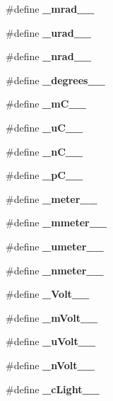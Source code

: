 \begin{CompactItemize}
\item 
\#define \textbf{\_\-mrad\_\-\_\-}\label{bpm__units_8h_4d6c281cb96e2265c761e2548528b266}

\item 
\#define \textbf{\_\-urad\_\-\_\-}\label{bpm__units_8h_6093ed7c7a103bf9e2fd3972e928fb13}

\item 
\#define \textbf{\_\-nrad\_\-\_\-}\label{bpm__units_8h_798792094a66ffcadcfc530d8acbee46}

\item 
\#define \textbf{\_\-degrees\_\-\_\-}\label{bpm__units_8h_631ddf20ea27e7e69d032bf17d4cade9}

\item 
\#define \textbf{\_\-mC\_\-\_\-}\label{bpm__units_8h_b08b83792d971febbd6badaac28c51d4}

\item 
\#define \textbf{\_\-uC\_\-\_\-}\label{bpm__units_8h_9108dd8cbb5e6db5f664d790016cda8b}

\item 
\#define \textbf{\_\-nC\_\-\_\-}\label{bpm__units_8h_12f5841aa9c4bac2152d6052829ea628}

\item 
\#define \textbf{\_\-pC\_\-\_\-}\label{bpm__units_8h_204e0e0484a2ebd68bbfdcb99e4bf3ea}

\item 
\#define \textbf{\_\-meter\_\-\_\-}\label{bpm__units_8h_89fc3df3aec49ff01cbcfd03947bde8c}

\item 
\#define \textbf{\_\-mmeter\_\-\_\-}\label{bpm__units_8h_cfea46ea9bb29f6cad74814b7cc256aa}

\item 
\#define \textbf{\_\-umeter\_\-\_\-}\label{bpm__units_8h_ff9f057c3538ad8ab5aad28353c762ca}

\item 
\#define \textbf{\_\-nmeter\_\-\_\-}\label{bpm__units_8h_101c2addbeed340f937742d7901ee5bb}

\item 
\#define \textbf{\_\-Volt\_\-\_\-}\label{bpm__units_8h_0b3f5b8ae4eb0b5955472c57982f3cff}

\item 
\#define \textbf{\_\-mVolt\_\-\_\-}\label{bpm__units_8h_30871b3fb170e681b8b3d97bca2baee0}

\item 
\#define \textbf{\_\-uVolt\_\-\_\-}\label{bpm__units_8h_dee9bfcaff1d1c86812ee6bb0b034145}

\item 
\#define \textbf{\_\-nVolt\_\-\_\-}\label{bpm__units_8h_9f057688b7b4bf0d7acdadc23dc69983}

\item 
\#define \textbf{\_\-cLight\_\-\_\-}\label{bpm__units_8h_1911c1e9314a68633c20e549ee08ac9f}

\end{CompactItemize}
